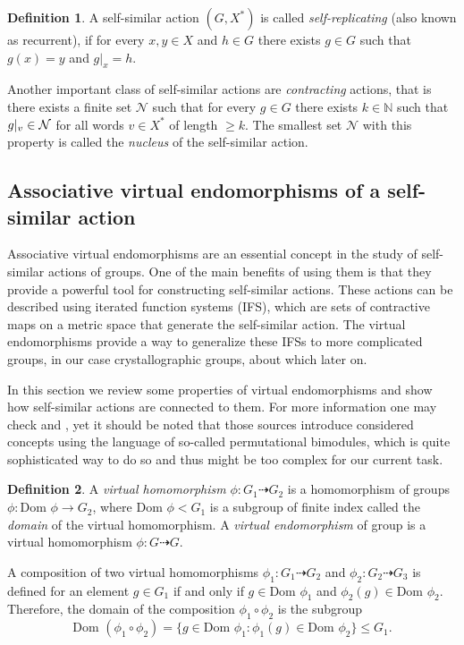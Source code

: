 \documentclass[a4paper,12pt]{amsart}
\theoremstyle{definition}
\newtheorem{definition}{Definition}
\newcommand{\Dom}{\text{Dom }}
\begin{document}
	\begin{definition}
		A self-similar action $(G,X^{*})$ is called \textit{self-replicating} (also known as recurrent), if for every $x,y\in X$ and $h\in G$ there exists $g\in G$ such that $g(x)=y$ and $g|_x=h$.
	\end{definition}
	
	
	Another important class of self-similar actions are \textit{contracting} actions, that is there exists a finite set $\mathcal{N}$ such that for every $g \in G$ there exists $k \in \mathbb{N}$ such that $g\arrowvert_v \in \mathcal{N}$ for all words $v \in X^*$ of length $\ge k$. The smallest set $\mathcal{N}$ with this property is called the \textit{nucleus} of the self-similar action. 
	
	\subsection{Associative virtual endomorphisms of a self-similar action} Associative virtual endomorphisms are an essential concept in the study of self-similar actions of groups. One of the main benefits of using them is that they provide a powerful tool for constructing self-similar actions. These actions can be described using iterated function systems (IFS), which are sets of contractive maps on a metric space that generate the self-similar action. The virtual endomorphisms provide a way to generalize these IFSs to more complicated groups, in our case crystallographic groups, about which later on. 
	
	In this section we review some properties of virtual endomorphisms and show how self-similar actions are connected to them. For more information one may check \cite{Nekrashevych:self-similar} and \cite{Nekrashevych:virtual_endomorphisms}, yet it should be noted that those sources introduce considered concepts using the language of so-called permutational bimodules, which is quite sophisticated way to do so and thus might be too complex for our current task. 
	
	\begin{definition}
		A \textit{virtual homomorphism} $\phi: G_1 \dashrightarrow G_2$ is a homomorphism of groups $\phi: \Dom \phi \rightarrow G_2$, where $\Dom \phi < G_1$ is a subgroup of finite index called the \textit{domain} of the virtual homomorphism. A \textit{virtual endomorphism} of group is a virtual homomorphism $\phi: G \dashrightarrow G$.
	\end{definition}
	
	
	A composition of two virtual homomorphisms $\phi_1: G_1 \dashrightarrow G_2$ and $\phi_2: G_2 \dashrightarrow G_3$ is defined for an element $g \in G_1$ if and only if $g \in \Dom\phi_1$ and $\phi_2(g) \in \Dom\phi_2$. Therefore, the domain of the composition $\phi_1 \circ \phi_2$ is the subgroup 
	$$
	\Dom (\phi_1 \circ \phi_2) = \{g \in \Dom \phi_1: \phi_1 (g) \in \Dom \phi_2\} \le G_1.
	$$
	
\end{document}
